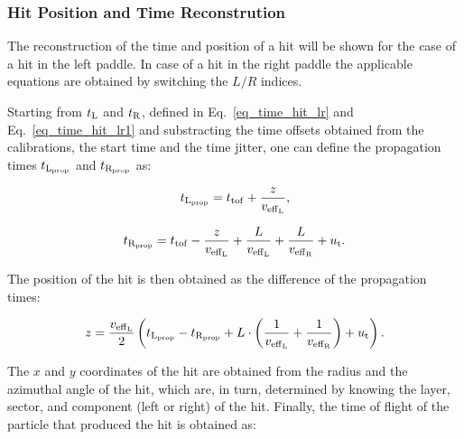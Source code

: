 \documentclass[3p,times,twocolumn]{elsarticle}
\begin{document}
%
%

\subsubsection{Hit Position and Time Reconstrution}

The reconstruction of the time and position of a hit will be shown for the case of a hit in the left paddle. In
case of a hit in the right paddle the applicable equations are obtained by switching the $L/R$ indices.

Starting from $t_{\rm{L}}$ and $t_{\rm{R}}$, defined in Eq.~\ref{eq_time_hit_lr} and Eq.~\ref{eq_time_hit_lr1}
and substracting the time offsets obtained from the calibrations, the start time and the time jitter, one can
define the propagation times $t_{\rm{L}_{\rm{prop}}}$ and $t_{\rm{R}_{\rm{prop}}}$ as:

\begin{equation}
t_{\rm{L}_{\rm{prop}}}=t_{\rm{tof}}+\frac{z}{v_{\rm{eff}_{\rm{L}}}},
\end{equation}

\begin{equation}
t_{\rm{R}_{\rm{prop}}}=t_{\rm{tof}}-\frac{z}{v_{\rm{eff}_{\rm{L}}}}+\frac{L}{v_{\rm{eff}_{\rm{L}}}}
+\frac{L}{v_{\rm{eff}_{\rm{R}}}}+u_{\rm{t}}.
\end{equation}

The position of the hit is then obtained as the difference of the propagation times:

\begin{equation}
z=\frac{v_{\rm{eff}_{\rm{L}}}}{2} \left(t_{\rm{L}_{\rm{prop}}}-t_{\rm{R}_{\rm{prop}}}
+ L \cdot \left(\frac{1}{v_{\rm{eff}_{\rm{L}}}}+\frac{1}{v_{\rm{eff}_{\rm{R}}}}\right)  +u_{\rm{t}}\right).
\end{equation}

The $x$ and $y$ coordinates of the hit are obtained from the radius and the azimuthal angle of the hit, which
are, in turn, determined by knowing the layer, sector, and component (left or right) of the hit.  Finally, the time
of flight of the particle that produced the hit is obtained as:
\end{document}

